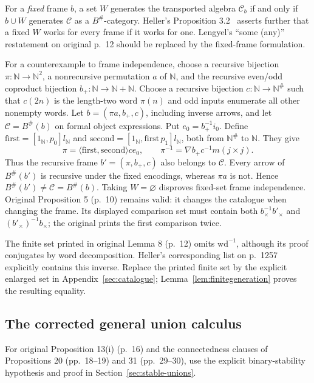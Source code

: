 \documentclass[11pt]{article}
\newcommand{\C}{\mathcal C}\newcommand{\D}{\mathcal D}\newcommand{\B}{\mathcal B}
\begin{document}
For a \emph{fixed} frame $b$, a set $W$ generates the transported algebra $\C_b$ if and only if $b\cup W$ generates $\C$ as a $B^\#$-category. Heller's Proposition 3.2~\cite{H} asserts further that a fixed $W$ works for every frame if it works for one. Lengyel's ``some (any)'' restatement on original p.~12 should be replaced by the fixed-frame formulation.

For a counterexample to frame independence, choose a recursive bijection $\pi:\mathbb N\to\mathbb N^2$, a nonrecursive permutation $a$ of $\mathbb N$, and the recursive even/odd coproduct bijection $b_+:\mathbb N\to\mathbb N+\mathbb N$. Choose a recursive bijection $c:\mathbb N\to\mathbb N^\#$ such that $c(2n)$ is the length-two word $\pi(n)$ and odd inputs enumerate all other nonempty words. Let $b=(\pi a,b_+,c)$, including inverse arrows, and let $\C=B^\#(b)$ on formal object expressions. Put $e_0=b_+^{-1}i_0$. Define $\mathrm{first}=[1_{\mathbb N},p_0]l_{\mathbb N}$ and $\mathrm{second}=[1_{\mathbb N},\mathrm{first}\,p_1]l_{\mathbb N}$, both from $\mathbb N^\#$ to $\mathbb N$. They give
\[
\pi=\langle\mathrm{first},\mathrm{second}\rangle c e_0,
\qquad
\pi^{-1}=\nabla b_+c^{-1}m(j\times j).
\]
Thus the recursive frame $b'=(\pi,b_+,c)$ also belongs to $\C$. Every arrow of $B^\#(b')$ is recursive under the fixed encodings, whereas $\pi a$ is not. Hence $B^\#(b')\ne\C=B^\#(b)$. Taking $W=\varnothing$ disproves fixed-set frame independence. Original Proposition 5 (p.~10) remains valid: it changes the catalogue when changing the frame. Its displayed comparison set must contain both $b_\times^{-1}b'_\times$ and $(b'_\times)^{-1}b_\times$; the original prints the first comparison twice.

The finite set printed in original Lemma 8 (p.~12) omits $\mathrm{wd}^{-1}$, although its proof conjugates by word decomposition. Heller's corresponding list on p.~1257 explicitly contains this inverse. Replace the printed finite set by the explicit enlarged set in Appendix~\ref{sec:catalogue}; Lemma~\ref{lem:finitegeneration} proves the resulting equality.

\subsection{The corrected general union calculus}\label{sec:direct-images}
For original Proposition 13(i) (p.~16) and the connectedness clauses of Propositions 20 (pp.~18--19) and 31 (pp.~29--30), use the explicit binary-stability hypothesis and proof in Section~\ref{sec:stable-unions}.
\end{document}
